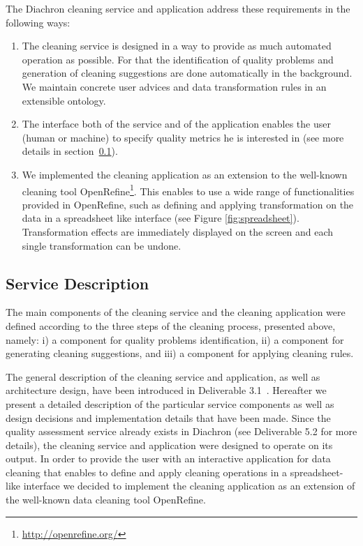 The Diachron cleaning service and application address these requirements in the following ways:

\begin{enumerate}
\item The cleaning service is designed in a way to provide as much automated operation as possible. For that the identification of quality problems and generation of cleaning suggestions are done automatically in the background.
We maintain concrete user advices and data transformation rules in an extensible ontology.
\item The interface both of the service and of the application enables the user (human or machine) to specify quality metrics he is interested in (see more details in section~\ref{sec:serviceDescription}).
\item  We implemented the cleaning application as an extension to the well-known cleaning tool OpenRefine\footnote{\url{http://openrefine.org/}}. This enables to use a wide range of functionalities provided in OpenRefine, such as defining and applying transformation on the data in a spreadsheet like interface (see Figure \ref{fig:spreadsheet}).
Transformation effects are immediately displayed on the screen and each single transformation can be undone.  
\end{enumerate}


\subsection{Service Description}
\label{sec:serviceDescription}

The main components of the cleaning service and the cleaning application were defined according to the three steps of the cleaning process, presented above, namely: i) a component for quality problems identification, ii) a component for generating cleaning suggestions, and iii) a component for applying cleaning rules.

The general description of the cleaning service and application, as well as architecture design, have been introduced in Deliverable 3.1~\cite{d3.1}.
Hereafter we present a detailed description of the particular service components as well as design decisions and implementation details that have been made.
Since the quality assessment service already exists in Diachron (see Deliverable 5.2 \cite{diachron-d5.1} for more details), the cleaning service and application were designed to operate on its output.
In order to provide the user with an interactive application for data cleaning that enables to define and apply cleaning operations in a spreadsheet-like interface we decided to implement the cleaning application as an extension of the well-known data cleaning tool OpenRefine.

